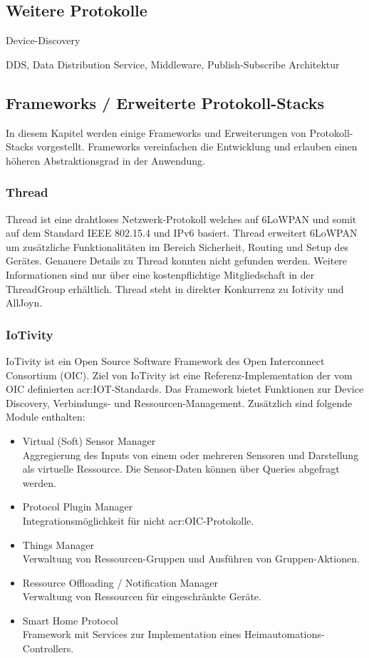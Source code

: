 \subsection{Weitere Protokolle} 
Device-Discovery

DDS, Data Distribution Service, Middleware, Publish-Subscribe Architektur

\subsection{Frameworks / Erweiterte Protokoll-Stacks}
In diesem Kapitel werden einige Frameworks und Erweiterungen von Protokoll-Stacks vorgestellt. Frameworks vereinfachen die Entwicklung und erlauben einen höheren Abstraktionsgrad in der Anwendung.


\subsubsection{Thread}
Thread ist eine drahtloses Netzwerk-Protokoll welches auf 6LoWPAN und somit auf dem Standard IEEE 802.15.4 und IPv6 basiert. Thread erweitert 6LoWPAN um zusätzliche Funktionalitäten im Bereich Sicherheit, Routing und Setup des Gerätes. Genauere Details zu Thread konnten nicht gefunden werden. Weitere Informationen sind nur über eine kostenpflichtige Mitgliedschaft in der ThreadGroup erhältlich. Thread steht in direkter Konkurrenz zu Iotivity und AllJoyn.


\subsubsection{IoTivity}
IoTivity ist ein Open Source Software Framework des Open Interconnect Consortium (OIC). Ziel von IoTivity ist eine Referenz-Implementation der vom OIC definierten \gls{acr:IOT}-Standards. Das Framework bietet Funktionen zur Device Discovery, Verbindungs- und Ressourcen-Management. Zusätzlich sind folgende Module enthalten:

\begin{itemize}
\item Virtual (Soft) Sensor Manager \\
Aggregierung des Inputs von einem oder mehreren Sensoren und Darstellung als virtuelle Ressource. Die Sensor-Daten können über Queries abgefragt werden.
\item Protocol Plugin Manager\\
Integrationsmöglichkeit für nicht \gls{acr:OIC}-Protokolle.
\item Things Manager\\
Verwaltung von Ressourcen-Gruppen und Ausführen von Gruppen-Aktionen.
\item Ressource Offloading / Notification Manager\\
Verwaltung von Ressourcen für eingeschränkte Geräte.
\item Smart Home Protocol\\
Framework mit Services zur Implementation eines Heimautomations-Controllers.
\end{itemize}

